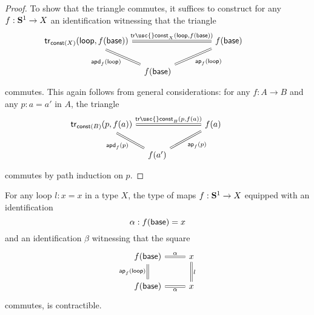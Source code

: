 \begin{proof}
  To show that the triangle commutes, it suffices to construct for any $f:\mathbf{S}^{1}\to X$ an identification witnessing that the triangle
  \begin{equation*}
    \begin{tikzcd}[column sep=1em]
      \tr_{\const(X)}(\lloop,f(\base)) \arrow[dr,equals,swap,"\apd{f}{\lloop}"] \arrow[rr,equals,"{\mathsf{tr\usc{}const}_X(\lloop,f(\base))}"] & & f(\base) \arrow[dl,equals,"\ap{f}{\lloop}"] \\
      & f(\base) & \phantom{\tr_{\const(X)}(\lloop,f(\base))}
    \end{tikzcd}
  \end{equation*}
  commutes. This again follows from general considerations: for any $f:A\to B$ and any $p:a=a'$ in $A$, the triangle
  \begin{equation*}
    \begin{tikzcd}[column sep=1em]
      \tr_{\const(B)}(p,f(a)) \arrow[dr,equals,swap,"\apd{f}{p}"] \arrow[rr,equals,"{\mathsf{tr\usc{}const}_B(p,f(a))}"] & & f(a) \arrow[dl,equals,"\ap{f}{p}"] \\
      & f(a') & \phantom{\tr_{\const(B)}(p,f(a))}
    \end{tikzcd}
  \end{equation*}
  commutes by path induction on $p$.
\end{proof}

\begin{cor}
  For any loop $l:x=x$ in a type $X$, the type of maps $f:\mathbf{S}^{1}\to X$ equipped with an identification
  \begin{equation*}
    \alpha : f(\mathsf{base})=x 
  \end{equation*}
  and an identification $\beta$ witnessing that the square
  \begin{equation*}
    \begin{tikzcd}
      f(\base) \arrow[r,equals,"\alpha"] \arrow[d,equals,swap,"\ap{f}{\lloop}"] & x \arrow[d,equals,"l"] \\
      f(\base) \arrow[r,equals,swap,"\alpha"] & x
    \end{tikzcd}
  \end{equation*}
  commutes, is contractible.
\end{cor}

